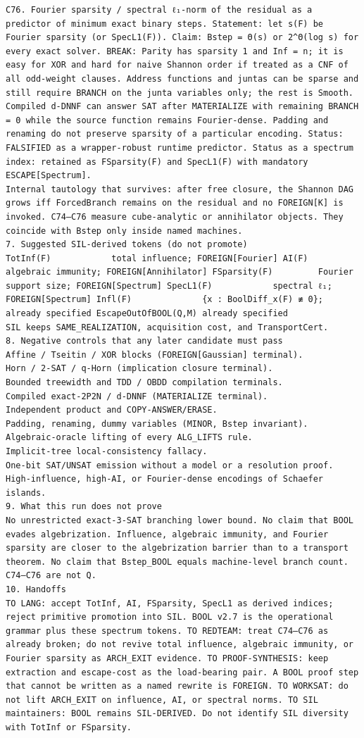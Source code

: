 \documentclass[11pt]{article}
\begin{document}
\begin{Verbatim}[breaklines=true,breakanywhere=true]
C76. Fourier sparsity / spectral ℓ₁-norm of the residual as a predictor of minimum exact binary steps. Statement: let s(F) be Fourier sparsity (or SpecL1(F)). Claim: Bstep = Θ(s) or 2^Θ(log s) for every exact solver. BREAK: Parity has sparsity 1 and Inf = n; it is easy for XOR and hard for naive Shannon order if treated as a CNF of all odd-weight clauses. Address functions and juntas can be sparse and still require BRANCH on the junta variables only; the rest is Smooth. Compiled d-DNNF can answer SAT after MATERIALIZE with remaining BRANCH = 0 while the source function remains Fourier-dense. Padding and renaming do not preserve sparsity of a particular encoding. Status: FALSIFIED as a wrapper-robust runtime predictor. Status as a spectrum index: retained as FSparsity(F) and SpecL1(F) with mandatory ESCAPE[Spectrum].
Internal tautology that survives: after free closure, the Shannon DAG grows iff ForcedBranch remains on the residual and no FOREIGN[K] is invoked. C74–C76 measure cube-analytic or annihilator objects. They coincide with Bstep only inside named machines.
7. Suggested SIL-derived tokens (do not promote)
TotInf(F)            total influence; FOREIGN[Fourier] AI(F)                algebraic immunity; FOREIGN[Annihilator] FSparsity(F)         Fourier support size; FOREIGN[Spectrum] SpecL1(F)            spectral ℓ₁; FOREIGN[Spectrum] Infl(F)              {x : BoolDiff_x(F) ≢ 0}; already specified EscapeOutOfBOOL(Q,M) already specified
SIL keeps SAME_REALIZATION, acquisition cost, and TransportCert.
8. Negative controls that any later candidate must pass
Affine / Tseitin / XOR blocks (FOREIGN[Gaussian] terminal).
Horn / 2-SAT / q-Horn (implication closure terminal).
Bounded treewidth and TDD / OBDD compilation terminals.
Compiled exact-2P2N / d-DNNF (MATERIALIZE terminal).
Independent product and COPY-ANSWER/ERASE.
Padding, renaming, dummy variables (MINOR, Bstep invariant).
Algebraic-oracle lifting of every ALG_LIFTS rule.
Implicit-tree local-consistency fallacy.
One-bit SAT/UNSAT emission without a model or a resolution proof.
High-influence, high-AI, or Fourier-dense encodings of Schaefer islands.
9. What this run does not prove
No unrestricted exact-3-SAT branching lower bound. No claim that BOOL evades algebrization. Influence, algebraic immunity, and Fourier sparsity are closer to the algebrization barrier than to a transport theorem. No claim that Bstep_BOOL equals machine-level branch count. C74–C76 are not Q.
10. Handoffs
TO LANG: accept TotInf, AI, FSparsity, SpecL1 as derived indices; reject primitive promotion into SIL. BOOL v2.7 is the operational grammar plus these spectrum tokens. TO REDTEAM: treat C74–C76 as already broken; do not revive total influence, algebraic immunity, or Fourier sparsity as ARCH_EXIT evidence. TO PROOF-SYNTHESIS: keep extraction and escape-cost as the load-bearing pair. A BOOL proof step that cannot be written as a named rewrite is FOREIGN. TO WORKSAT: do not lift ARCH_EXIT on influence, AI, or spectral norms. TO SIL maintainers: BOOL remains SIL-DERIVED. Do not identify SIL diversity with TotInf or FSparsity.

\end{Verbatim}
\end{document}
